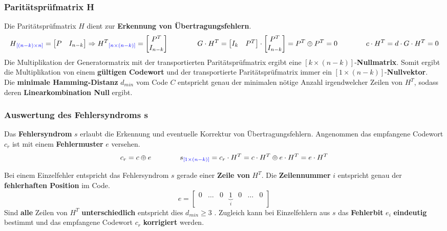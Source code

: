 \subsubsection{Paritätsprüfmatrix H } \label{paritycheckmatrix}
Die Paritätsprüfmatrix $H$ dient zur \textbf{Erkennung von Übertragungsfehlern}. 
$$H\textcolor{blue}{_{[(n-k) \times n]}} = \begin{bmatrix}P & I_{n-k}\end{bmatrix} \Rightarrow
H^T\textcolor{blue}{_{[n \times (n-k)]}} =
\begin{bmatrix} P^T \\ I_{n-k}\end{bmatrix} 
\qquad \qquad 
G \cdot H^T = \begin{bmatrix}I_k & P^T\end{bmatrix} \cdot 
 \begin{bmatrix} P^T \\ I_{n-k}\end{bmatrix} = P^T \oplus P^T = 0
	\qquad \qquad
	c \cdot H^T = d \cdot G \cdot H^T = 0
	 $$
Die Multiplikation der Generatormatrix mit der transportierten Paritätsprüfmatrix ergibt eine 
$[k \times (n-k)]$-\textbf{Nullmatrix}. Somit ergibt die Multiplikation von einem
\textbf{gültigen Codewort} und der transportierte Paritätsprüfmatrix immer ein $[1
\times (n-k)]$-\textbf{Nullvektor}. \\
Die \textbf{minimale Hamming-Distanz} $d_{min}$ vom Code $C$ entspricht genau der minimalen
nötige Anzahl irgendwelcher Zeilen von $H^T$, sodass deren \textbf{Linearkombination Null} ergibt.


\subsubsection{Auswertung des Fehlersyndroms s }
Das \textbf{Fehlersyndrom} $s$ erlaubt die Erkennung und eventuelle Korrektur von Übertragungsfehlern.
Angenommen das empfangene Codewort $c_r$ ist mit einem \textbf{Fehlermuster} $e$ versehen.
$$c_r = c \oplus e \qquad \qquad s\textcolor{blue}{_{[1 \times (n-k)]}} = c_r \cdot H^T = c
\cdot H^T \oplus e \cdot H^T = e \cdot H^T$$

Bei einem Einzelfehler entspricht das Fehlersyndrom $s$ gerade einer \textbf{Zeile von }
\boldmath$H^T$\unboldmath . Die \textbf{Zeilennummer} $i$ entspricht genau der \textbf{fehlerhaften
Position} im Code. 
$$ e = \begin{bmatrix} 0 & \ldots & 0 & \underbrace{1}_i & 0 & \ldots & 0\end{bmatrix} $$ 
Sind \textbf{alle} Zeilen von $H^T$ \textbf{unterschiedlich} entspricht dies \boldmath $d_{min}
\geq 3$ \unboldmath . 
Zugleich kann bei Einzelfehlern aus $s$ das \textbf{Fehlerbit} $e_i$ \textbf{eindeutig} bestimmt und das 
empfangene Codewort $c_r$ \textbf{korrigiert} werden. \\

